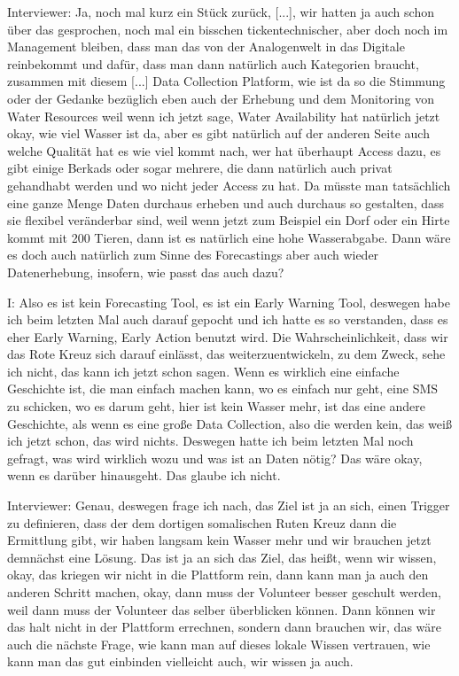 Interviewer: Ja, noch mal kurz ein St{\"u}ck zur{\"u}ck, [...], wir hatten ja auch schon {\"u}ber das gesprochen, noch mal ein bisschen tickentechnischer, aber doch noch im Management bleiben, dass man das von der Analogenwelt in das Digitale reinbekommt und daf{\"u}r, dass man dann nat{\"u}rlich auch Kategorien braucht, zusammen mit diesem [...]  Data Collection Platform, wie ist da so die Stimmung oder der Gedanke bez{\"u}glich eben auch der Erhebung und dem Monitoring von Water Resources weil wenn ich jetzt sage, Water Availability hat nat{\"u}rlich jetzt okay, wie viel Wasser ist da, aber es gibt nat{\"u}rlich auf der anderen Seite auch welche Qualit{\"a}t hat es wie viel kommt nach, wer hat {\"u}berhaupt Access dazu, es gibt einige Berkads oder sogar mehrere, die dann nat{\"u}rlich auch privat gehandhabt werden und wo nicht jeder Access zu hat. Da m{\"u}sste man tats{\"a}chlich eine ganze Menge Daten durchaus erheben und auch durchaus so gestalten, dass sie flexibel ver{\"a}nderbar sind, weil wenn jetzt zum Beispiel ein Dorf oder ein Hirte kommt mit 200 Tieren, dann ist es nat{\"u}rlich eine hohe Wasserabgabe. Dann w{\"a}re es doch auch nat{\"u}rlich zum Sinne des Forecastings aber auch wieder Datenerhebung, insofern, wie passt das auch dazu? 

I: Also es ist kein Forecasting Tool, es ist ein Early Warning Tool, deswegen habe ich beim letzten Mal auch darauf gepocht und ich hatte es so verstanden, dass es eher Early Warning, Early Action benutzt wird. Die Wahrscheinlichkeit, dass wir das Rote Kreuz sich darauf einl{\"a}sst, das weiterzuentwickeln, zu dem Zweck, sehe ich nicht, das kann ich jetzt schon sagen. Wenn es wirklich eine einfache Geschichte ist, die man einfach machen kann, wo es einfach nur geht, eine SMS zu schicken, wo es darum geht, hier ist kein Wasser mehr, ist das eine andere Geschichte, als wenn es eine große Data Collection, also die werden kein, das weiß ich jetzt schon, das wird nichts. Deswegen hatte ich beim letzten Mal noch gefragt, was wird wirklich wozu und was ist an Daten n{\"o}tig? Das w{\"a}re okay, wenn es dar{\"u}ber hinausgeht. Das glaube ich nicht. 

Interviewer: Genau, deswegen frage ich nach, das Ziel ist ja an sich, einen Trigger zu definieren, dass der dem dortigen somalischen Ruten Kreuz dann die Ermittlung gibt, wir haben langsam kein Wasser mehr und wir brauchen jetzt demn{\"a}chst eine L{\"o}sung. Das ist ja an sich das Ziel, das heißt, wenn wir wissen, okay, das kriegen wir nicht in die Plattform rein, dann kann man ja auch den anderen Schritt machen, okay, dann muss der Volunteer besser geschult werden, weil dann muss der Volunteer das selber {\"u}berblicken k{\"o}nnen. Dann k{\"o}nnen wir das halt nicht in der Plattform errechnen, sondern dann brauchen wir, das w{\"a}re auch die n{\"a}chste Frage, wie kann man auf dieses lokale Wissen vertrauen, wie kann man das gut einbinden vielleicht auch, wir wissen ja auch. 

